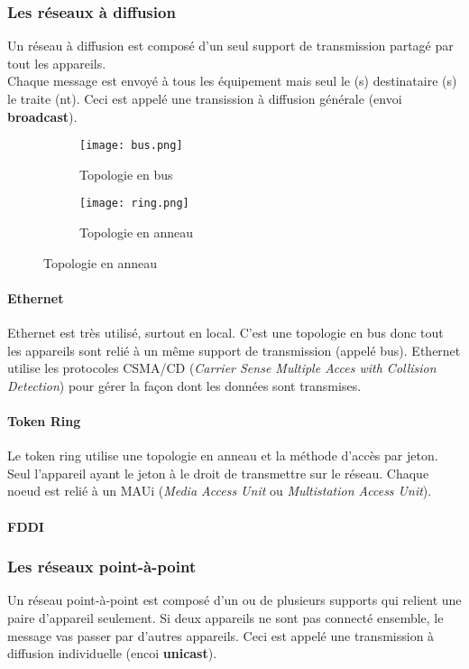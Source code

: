 \documentclass[10pt,a4paper]{article}
\begin{document}
 \subsubsection{Les réseaux à diffusion}
 Un réseau à diffusion est composé d'un seul support de transmission partagé par tout les appareils.\\
 Chaque message est envoyé à tous les équipement mais seul le (s) destinataire (s) le traite (nt). Ceci est appelé une transission à diffusion générale (envoi \textbf{broadcast}).\\
 \begin{figure}[h]
	 \begin{subfigure}{.5\textwidth}
		 \centering
		 \texttt{[image: bus.png]}
	 	 \caption{Topologie en bus}
	 \end{subfigure}
	 \begin{subfigure}{.5\textwidth}
		 \centering
		 \texttt{[image: ring.png]}
		 \caption{Topologie en anneau}
	 \end{subfigure}
 \end{figure}
 \paragraph{Ethernet}
 Ethernet est très utilisé, surtout en local. C'est une topologie en bus donc tout les appareils sont relié à un même support de transmission (appelé bus). Ethernet utilise les protocoles CSMA/CD (\textit{Carrier Sense Multiple Acces with Collision Detection}) pour gérer la façon dont les données sont transmises.
 \paragraph{Token Ring}
 Le token ring utilise une topologie en anneau et la méthode d'accès par jeton. Seul l'appareil ayant le jeton à le droit de transmettre sur le réseau. Chaque noeud est relié à un MAUi (\textit{Media Access Unit} ou \textit{Multistation Access Unit})\@.
 \paragraph{FDDI}






 \subsubsection{Les réseaux point-à-point}
 Un réseau point-à-point est composé d'un ou de plusieurs supports qui relient une paire d'appareil seulement.
 Si deux appareils ne sont pas connecté ensemble, le message vas passer par d'autres appareils. Ceci est appelé une transmission à diffusion individuelle (encoi \textbf{unicast}).






 
\end{document}
